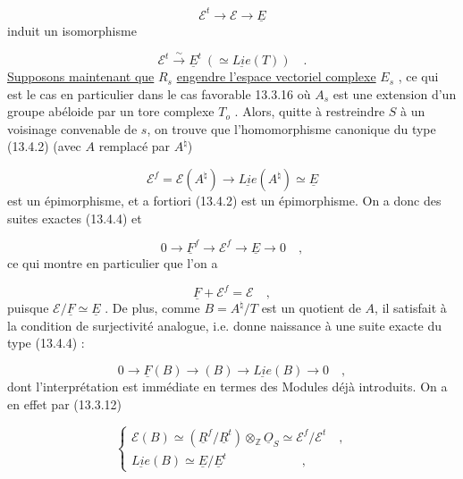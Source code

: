 \begin{equation*}
\mathcal{E}^t \longrightarrow \mathcal{E} \longrightarrow \underline{E}
\end{equation*}
induit un isomorphisme



\begin{equation}\tag{13.4.11}
\mathcal{E}^t \stackrel{\sim}{\longrightarrow} \underline{E}^t \ ( \simeq \underline{Lie}(T)) \quad .
\end{equation}
\underline{Supposons maintenant que} $R_s$ \underline{engendre l'espace vectoriel complexe} $E_s$ , ce qui est le cas en particulier dans le cas favorable 13.3.16 où $A_s$ est une extension d'un groupe abéloide par un tore complexe $T_o$ . Alors, quitte à restreindre $S$ à un voisinage convenable de $s$, on trouve que l'homomorphisme canonique du type (13.4.2) (avec $A$ remplacé par $A^\natural$)

\begin{equation*}
\mathcal{E}^f = \mathcal{E}(A^\natural) \longrightarrow \underline{Lie}(A^\natural) \simeq \underline{E}
\end{equation*}
est un épimorphisme, et a fortiori (13.4.2) est un épimorphisme. On a donc des suites exactes (13.4.4) et

\begin{equation}\tag{13.4.12}
0 \longrightarrow \underline{F}^f \longrightarrow \mathcal{E}^f \longrightarrow \underline{E} \longrightarrow 0 \quad ,
\end{equation}
ce qui montre en particulier que l'on a

\begin{equation}\tag{13.4.13}
\underline{F} + \mathcal{E}^f = \mathcal{E} \quad ,
\end{equation}
puisque $\mathcal{E}/\underline{F} \simeq \underline{E}$ . De plus, comme $B = A^\natural/T$ est un quotient de $A$, il satisfait à la condition de surjectivité analogue, i.e. donne naissance à une suite exacte du type (13.4.4) :

\begin{equation}\tag{13.4.14}
0 \longrightarrow \underline{F}(B) \longrightarrow (B) \longrightarrow \underline{Lie}(B) \longrightarrow 0 \quad ,
\end{equation}
dont l'interprétation est immédiate en termes des Modules déjà introduits. On a en effet par (13.3.12)

\begin{equation}\tag{13.4.15}
\left\{ \begin{array}{l} \mathcal{E}(B) \simeq (\underline{R}^f / \underline{R}^t) \otimes_{\mathbb{Z}} \underline{O}_S \simeq \mathcal{E}^f / \mathcal{E}^t \quad , \\[3ex] \underline{Lie}(B) \simeq \underline{E} / \underline{E}^t \qquad\qquad\qquad , \end{array} \right.
\end{equation}

